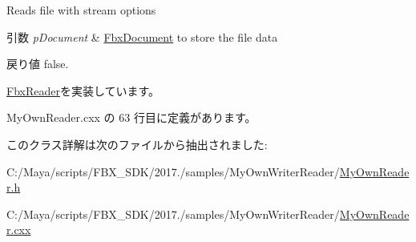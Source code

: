 Reads file with stream options 
\begin{DoxyParams}{引数}
{\em p\+Document} & \hyperlink{class_fbx_document}{Fbx\+Document} to store the file data \\
\hline
\end{DoxyParams}
\begin{DoxyReturn}{戻り値}
{\ttfamily false}. 
\end{DoxyReturn}


\hyperlink{class_fbx_reader_a29941746acc73d7ffd2411a9be9d2525}{Fbx\+Reader}を実装しています。



 My\+Own\+Reader.\+cxx の 63 行目に定義があります。



このクラス詳解は次のファイルから抽出されました\+:\begin{DoxyCompactItemize}
\item 
C\+:/\+Maya/scripts/\+F\+B\+X\+\_\+\+S\+D\+K/2017./samples/\+My\+Own\+Writer\+Reader/\hyperlink{_my_own_reader_8h}{My\+Own\+Reader.\+h}\item 
C\+:/\+Maya/scripts/\+F\+B\+X\+\_\+\+S\+D\+K/2017./samples/\+My\+Own\+Writer\+Reader/\hyperlink{_my_own_reader_8cxx}{My\+Own\+Reader.\+cxx}\end{DoxyCompactItemize}
